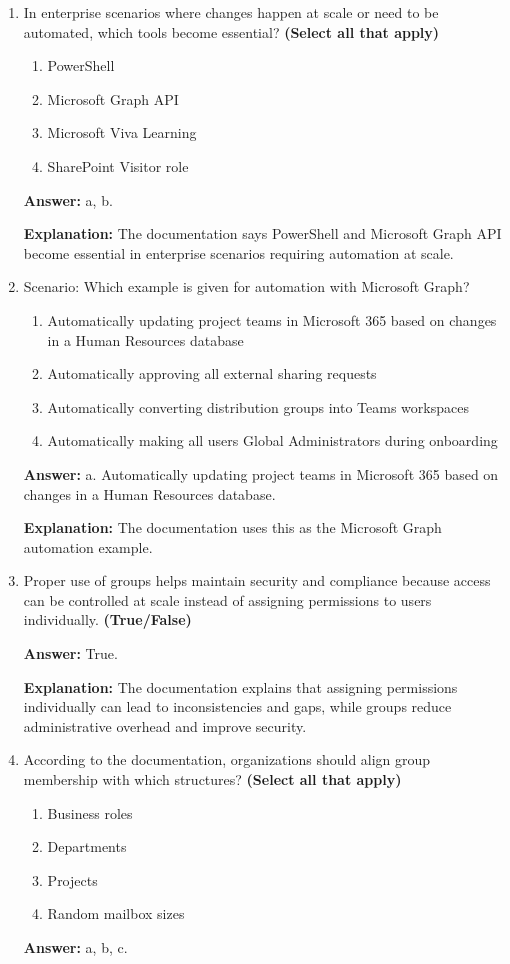\documentclass[10pt]{article}
\begin{document}
\begin{enumerate}[leftmargin=*]
\textbf{Explanation:} All four are explicitly listed in the Microsoft Entra admin center paragraph.

\item In enterprise scenarios where changes happen at scale or need to be automated, which tools become essential? \textbf{(Select all that apply)}
\begin{enumerate}[label=\alph*., leftmargin=1.5em]
\item PowerShell
\item Microsoft Graph API
\item Microsoft Viva Learning
\item SharePoint Visitor role
\end{enumerate}
\textbf{Answer:} a, b.

\textbf{Explanation:} The documentation says PowerShell and Microsoft Graph API become essential in enterprise scenarios requiring automation at scale.

\item Scenario: Which example is given for automation with Microsoft Graph?
\begin{enumerate}[label=\alph*., leftmargin=1.5em]
\item Automatically updating project teams in Microsoft 365 based on changes in a Human Resources database
\item Automatically approving all external sharing requests
\item Automatically converting distribution groups into Teams workspaces
\item Automatically making all users Global Administrators during onboarding
\end{enumerate}
\textbf{Answer:} a. Automatically updating project teams in Microsoft 365 based on changes in a Human Resources database.

\textbf{Explanation:} The documentation uses this as the Microsoft Graph automation example.

\item Proper use of groups helps maintain security and compliance because access can be controlled at scale instead of assigning permissions to users individually. \textbf{(True/False)}

\textbf{Answer:} True.

\textbf{Explanation:} The documentation explains that assigning permissions individually can lead to inconsistencies and gaps, while groups reduce administrative overhead and improve security.

\item According to the documentation, organizations should align group membership with which structures? \textbf{(Select all that apply)}
\begin{enumerate}[label=\alph*., leftmargin=1.5em]
\item Business roles
\item Departments
\item Projects
\item Random mailbox sizes
\end{enumerate}
\textbf{Answer:} a, b, c.


\end{enumerate}
\end{document}

